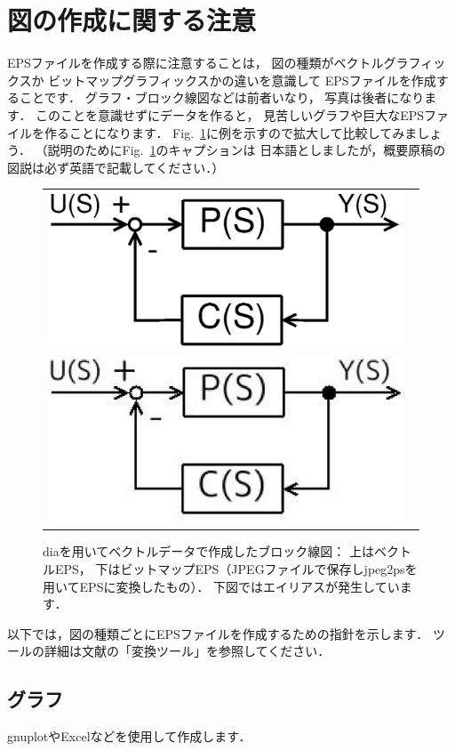 \documentclass[twocolumn]{jsarticle}
\begin{document}
\section{図の作成に関する注意}
EPSファイルを作成する際に注意することは，
図の種類がベクトルグラフィックスか
ビットマップグラフィックスかの違いを意識して
EPSファイルを作成することです．
グラフ・ブロック線図などは前者いなり，
写真は後者になります．
このことを意識せずにデータを作ると，
見苦しいグラフや巨大なEPSファイルを作ることになります．
Fig.~\ref{fig:ComparingEPS}に例を示すので拡大して比較してみましょう．
（説明のためにFig.~\ref{fig:ComparingEPS}のキャプションは
日本語としましたが，概要原稿の図説は必ず英語で記載してください．）
%
\begin{figure}[tb]
  \centering
  \begin{tabular}[t]{cc}
    \includegraphics[width=0.65\linewidth]{fig/Feedback.eps} \\
    \includegraphics[width=0.65\linewidth]{fig/Feedback-jpeg.eps}
  \end{tabular}
  \caption{diaを用いてベクトルデータで作成したブロック線図：
    上はベクトルEPS，
    下はビットマップEPS（JPEGファイルで保存しjpeg2psを用いてEPSに変換したもの）．
    下図ではエイリアスが発生しています．}
  \label{fig:ComparingEPS}
\end{figure}

以下では，図の種類ごとにEPSファイルを作成するための指針を示します．
ツールの詳細は文献\cite{TeXWiki}の「変換ツール」を参照してください．

\subsection{グラフ}
gnuplotやExcelなどを使用して作成します．
\end{document}
